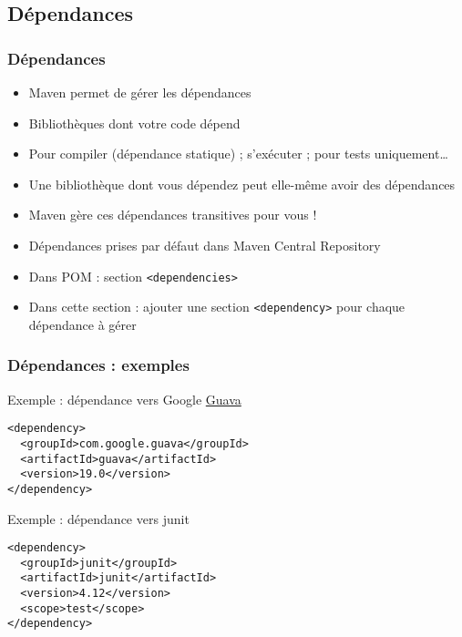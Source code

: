 \documentclass[english, french]{beamer}
\begin{document}
\subsection{Dépendances}
\begin{frame}
	\frametitle{Dépendances}
	\begin{itemize}
		\item Maven permet de gérer les \og{}dépendances\fg{}
		\item Bibliothèques dont votre code dépend
		\item Pour compiler (dépendance statique) ; s’exécuter ; pour tests uniquement…
		\item Une bibliothèque dont vous dépendez peut elle-même avoir des dépendances
		\item Maven gère ces dépendances transitives pour vous !
		\item Dépendances prises {\tiny par défaut} dans Maven Central Repository
		\item Dans POM : section \texttt{<dependencies>}
		\item Dans cette section : ajouter une section \texttt{<dependency>} pour chaque dépendance à gérer
	\end{itemize}
\end{frame}

\begin{frame}[fragile]
	\frametitle{Dépendances : exemples}
	\begin{block}{Exemple : dépendance vers Google \href{https://github.com/google/guava/blob/master/README.md}{Guava}}
		\begin{lstlisting}
<dependency>
  <groupId>com.google.guava</groupId>
  <artifactId>guava</artifactId>
  <version>19.0</version>
</dependency>
		\end{lstlisting}	
	\end{block}
	\begin{block}{Exemple : dépendance vers junit}
		\begin{lstlisting}
<dependency>
  <groupId>junit</groupId>
  <artifactId>junit</artifactId>
  <version>4.12</version>
  <scope>test</scope>
</dependency>
		\end{lstlisting}	
	\end{block}
\end{frame}
\end{document}
